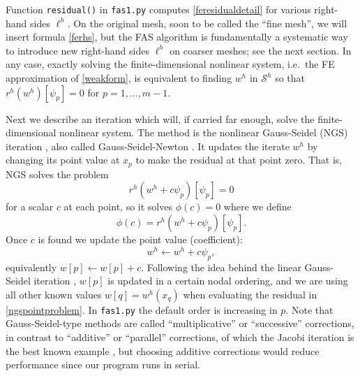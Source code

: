 \documentclass[letterpaper,final,12pt,reqno]{amsart}
\begin{document}
Function \texttt{residual()} in \texttt{fas1.py} computes \eqref{feresidualdetail} for various right-hand sides $\ell^h$.  On the original mesh, soon to be called the ``fine mesh'', we will insert formula \eqref{ferhs}, but the FAS algorithm is fundamentally a systematic way to introduce new right-hand sides $\ell^h$ on coarser meshes; see the next section.  In any case, exactly solving the finite-dimensional nonlinear system, i.e.~the FE approximation of \eqref{weakform}, is equivalent to finding $w^h$ in $\mathcal{S}^h$ so that $r^h(w^h)[\psi_p]=0$ for $p=1,\dots,m-1$.

Next we describe an iteration which will, if carried far enough, solve the finite-dimensional nonlinear system.  The method is the nonlinear Gauss-Seidel (NGS) iteration \cite{Briggsetal2000}, also called Gauss-Seidel-Newton \cite{BrandtLivne2011}.  It updates the iterate $w^h$ by changing its point value at $x_p$ to make the residual at that point zero.  That is, NGS solves the problem
\begin{equation}
r^h(w^h + c \psi_p)[\psi_p] = 0  \label{ngspointproblem}
\end{equation}
for a scalar $c$ at each point, so it solves $\phi(c)=0$ where we define
\begin{equation}
  \phi(c) = r^h(w^h + c \psi_p)[\psi_p]. \label{ngspointresidual}
\end{equation}
Once $c$ is found we update the point value (coefficient):
\begin{equation}
  w^h \leftarrow w^h + c \psi_p,  \label{ngspointupdate}
\end{equation}
equivalently $w[p] \leftarrow w[p] + c$.  Following the idea behind the linear Gauss-Seidel iteration \cite{Greenbaum1997}, $w[p]$ is updated in a certain nodal ordering, and we are using all other known values $w[q]=w^h(x_q)$ when evaluating the residual in \eqref{ngspointproblem}.  In \texttt{fas1.py} the default order is increasing in $p$.  Note that Gauss-Seidel-type methods are called ``multiplicative'' or ``successive'' \cite{GraeserKornhuber2009} corrections, in contrast to ``additive'' or ``parallel'' corrections, of which the Jacobi iteration is the best known example \cite{Greenbaum1997}, but choosing additive corrections would reduce performance since our program runs in serial.
\end{document}
